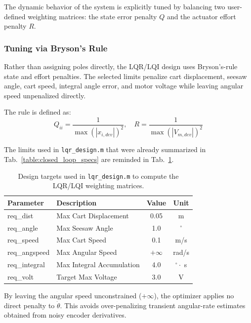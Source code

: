 \documentclass[11pt,a4paper]{article}
\begin{document}
The dynamic behavior of the system is explicitly tuned by balancing two user-defined weighting matrices: the state error penalty $Q$ and the actuator effort penalty $R$.

\subsubsection{Tuning via Bryson's Rule}
Rather than assigning poles directly, the LQR/LQI design uses Bryson's-rule state and effort penalties. The selected limits penalize cart displacement, seesaw angle, cart speed, integral angle error, and motor voltage while leaving angular speed unpenalized directly.

The rule is defined as:
\begin{equation}
Q_{ii} = \frac{1}{\max(|x_{i,dev}|)^2}, \quad R = \frac{1}{\max(|V_{m,dev}|)^2}
\end{equation}

The limits used in \texttt{lqr\_design.m} that were already summarized in Tab.~\ref{table:closed_loop_specs} are reminded in Tab.~\ref{table:bryson_targets}.

\begin{table}[H]
\caption*{\textbf{LQR/LQI Acceptable Deviations (Bryson's Rule)}}
\centering
\begin{tabular}{|p{10em} l c c |}
\hline
\rowcolor{bluePoli!40}
\textbf{Parameter} & \textbf{Description} & \textbf{Value} & \textbf{Unit} \T\B \\
\hline \hline
req\_dist & Max Cart Displacement & 0.05 & m \T\B \\
req\_angle & Max Seesaw Angle & 1.0 & $^\circ$ \T\B \\
req\_speed & Max Cart Speed & 0.1 & m/s \T\B \\
req\_angspeed & Max Angular Speed & $+\infty$ & rad/s \T\B \\
req\_integral & Max Integral Accumulation & 4.0 & $^\circ \cdot$ s \T\B \\
req\_volt & Target Max Voltage & 3.0 & V \B \\
\hline
\end{tabular}
\caption{Design targets used in \texttt{lqr\_design.m} to compute the LQR/LQI weighting matrices.}
\label{table:bryson_targets}
\end{table}

By leaving the angular speed unconstrained ($+\infty$), the optimizer applies no direct penalty to $\dot{\theta}$. This avoids over-penalizing transient angular-rate estimates obtained from noisy encoder derivatives.
\end{document}
